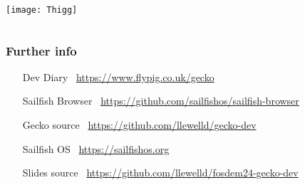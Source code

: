 \documentclass[
	notes=none,
	aspectratio=169
]{beamer}
\begin{document}

\begin{frame}

\begin{columns}[T]
\begin{column}[T]{1.0\textwidth}

\vspace{-0.12cm}
\hspace*{-1.1cm}
\texttt{[image: Thigg]}

\end{column}
\end{columns}

\end{frame}


\begin{frame}[fragile]
\frametitle{Further info}
\setlength{\leftmargini}{7.0em}
\vspace{0.8cm}

\begin{itemize}
\setlength{\parskip}{1.0em}
\item[Dev Diary] \, \url{https://www.flypig.co.uk/gecko}
\item[Sailfish Browser] \, \url{https://github.com/sailfishos/sailfish-browser}
\item[Gecko source] \, \url{https://github.com/llewelld/gecko-dev}
\item[Sailfish OS] \, \url{https://sailfishos.org}
\item[Slides source] \, \url{https://github.com/llewelld/fosdem24-gecko-dev}
\end{itemize}

\end{frame}
\note{
\fontsize{7pt}{8pt}{}

}

\end{document}
